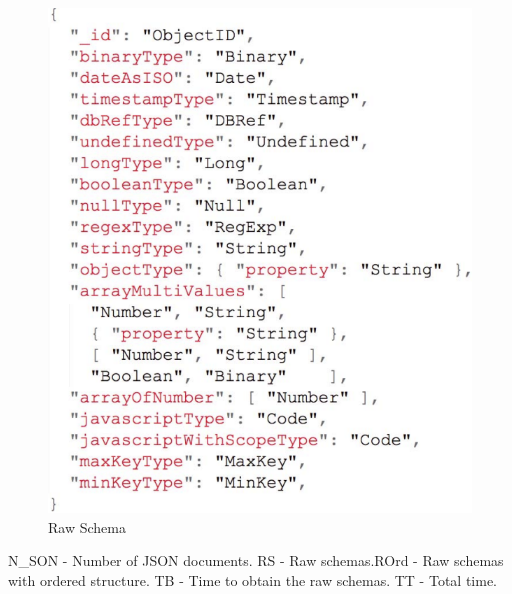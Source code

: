 \documentclass[sigconf, nonacm]{acmart}
\begin{document}
\begin{figure}
  \centering
  \includegraphics[width=0.6\linewidth]{figures/rawschema.png}
  \vspace{-10pt} %
  \caption{Raw Schema \cite{frozza2018approach}}
  \label{fig:rawschema}
\end{figure}

\begin{table}[ht]
  \centering
  \caption{Comparison With Wang et al \cite{wang2015schema}}
  \vspace{-10pt}
  \label{tab:example}
  \smallskip
  \vspace{1pt}
  \parbox{0.4\textwidth}{%
    \centering
    \raggedright
    \footnotesize
    N\_SON - Number of JSON documents. RS - Raw schemas.\newline ROrd - Raw schemas with ordered structure. TB - Time to obtain the raw schemas. TT - Total time.
  }
        \label{table1}

\end{table}
\end{document}
